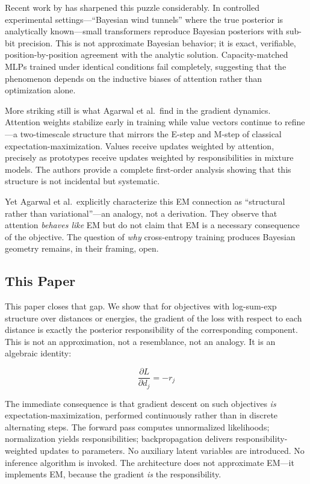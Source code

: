 Recent work by \citet{agarwal2025geometry,agarwal2025gradient} has sharpened this puzzle considerably. In controlled experimental settings---``Bayesian wind tunnels'' where the true posterior is analytically known---small transformers reproduce Bayesian posteriors with sub-bit precision. This is not approximate Bayesian behavior; it is exact, verifiable, position-by-position agreement with the analytic solution. Capacity-matched MLPs trained under identical conditions fail completely, suggesting that the phenomenon depends on the inductive biases of attention rather than optimization alone.

More striking still is what Agarwal et al.\ find in the gradient dynamics. Attention weights stabilize early in training while value vectors continue to refine---a two-timescale structure that mirrors the E-step and M-step of classical expectation-maximization. Values receive updates weighted by attention, precisely as prototypes receive updates weighted by responsibilities in mixture models. The authors provide a complete first-order analysis showing that this structure is not incidental but systematic.

Yet Agarwal et al.\ explicitly characterize this EM connection as ``structural rather than variational''---an analogy, not a derivation. They observe that attention \emph{behaves like} EM but do not claim that EM is a necessary consequence of the objective. The question of \emph{why} cross-entropy training produces Bayesian geometry remains, in their framing, open.

\subsection{This Paper}

This paper closes that gap. We show that for objectives with log-sum-exp structure over distances or energies, the gradient of the loss with respect to each distance is exactly the posterior responsibility of the corresponding component. This is not an approximation, not a resemblance, not an analogy. It is an algebraic identity:

\begin{equation}
\frac{\partial L}{\partial d_j} = -r_j
\end{equation}

The immediate consequence is that gradient descent on such objectives \emph{is} expectation-maximization, performed continuously rather than in discrete alternating steps. The forward pass computes unnormalized likelihoods; normalization yields responsibilities; backpropagation delivers responsibility-weighted updates to parameters. No auxiliary latent variables are introduced. No inference algorithm is invoked. The architecture does not approximate EM---it implements EM, because the gradient \emph{is} the responsibility.

